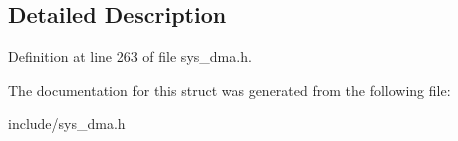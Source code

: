 \subsection{Detailed Description}


Definition at line 263 of file sys\+\_\+dma.\+h.



The documentation for this struct was generated from the following file\+:\begin{DoxyCompactItemize}
\item 
include/sys\+\_\+dma.\+h\end{DoxyCompactItemize}
